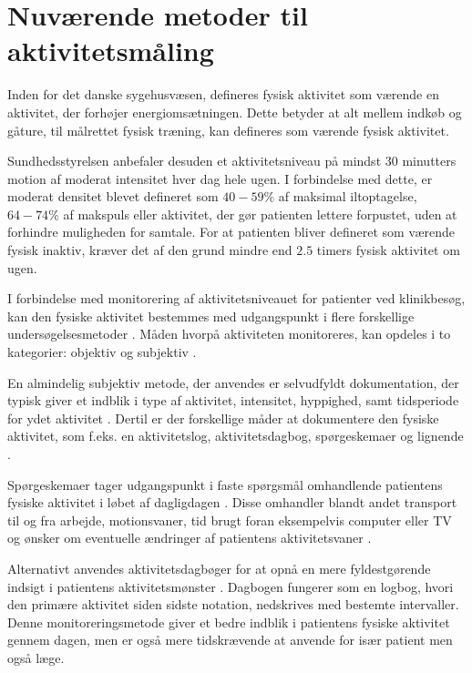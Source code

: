 \section{Nuværende metoder til aktivitetsmåling}

Inden for det danske sygehusvæsen, defineres fysisk aktivitet som værende en aktivitet, der forhøjer energiomsætningen. 
Dette betyder at alt mellem indkøb og gåture, til målrettet fysisk træning, kan defineres som værende fysisk aktivitet.\citep{gupta2013, terkelsen2015}

Sundhedsstyrelsen anbefaler desuden et aktivitetsniveau på mindst 30 minutters motion af moderat intensitet hver dag hele ugen. 
I forbindelse med dette, er moderat densitet blevet defineret som $40-59\%$ af maksimal iltoptagelse, $64-74\%$ af makspuls eller aktivitet, der gør patienten lettere forpustet, uden at forhindre muligheden for samtale. 
For at patienten bliver defineret som værende fysisk inaktiv, kræver det af den grund mindre end $2.5$ timers fysisk aktivitet om ugen.\citep{gupta2013}

I forbindelse med monitorering af aktivitetsniveauet for patienter ved klinikbesøg, kan den fysiske aktivitet bestemmes med udgangspunkt i flere forskellige undersøgelsesmetoder \citep{gupta2013}. 
Måden hvorpå aktiviteten monitoreres, kan opdeles i to kategorier: objektiv og subjektiv \citep{gupta2013, adamo2009}. 
 

En almindelig subjektiv metode, der anvendes er selvudfyldt dokumentation, der typisk giver et indblik i type af aktivitet, intensitet, hyppighed, samt tidsperiode for ydet aktivitet \citep{adamo2009}. Dertil er der forskellige måder at dokumentere den fysiske aktivitet, som f.eks. en aktivitetslog, aktivitetsdagbog, spørgeskemaer og lignende \citep{adamo2009}. 


Spørgeskemaer tager udgangspunkt i faste spørgsmål omhandlende patientens fysiske aktivitet i løbet af dagligdagen \citep{muller2009}. 
Disse omhandler blandt andet transport til og fra arbejde, motionsvaner, tid brugt foran eksempelvis computer eller TV og ønsker om eventuelle ændringer af patientens aktivitetsvaner \citep{gupta2013, vestergaard2012}. 

Alternativt anvendes aktivitetsdagbøger \citep{muller2009} for at opnå en mere fyldestgørende indsigt i patientens aktivitetsmønster \citep{gupta2013}. 
Dagbogen fungerer som en logbog, hvori den primære aktivitet siden sidste notation, nedskrives med bestemte intervaller. 
Denne monitoreringsmetode giver et bedre indblik i patientens fysiske aktivitet gennem dagen, men er også mere tidskrævende at anvende for især patient men også læge.\citep{gupta2013}

